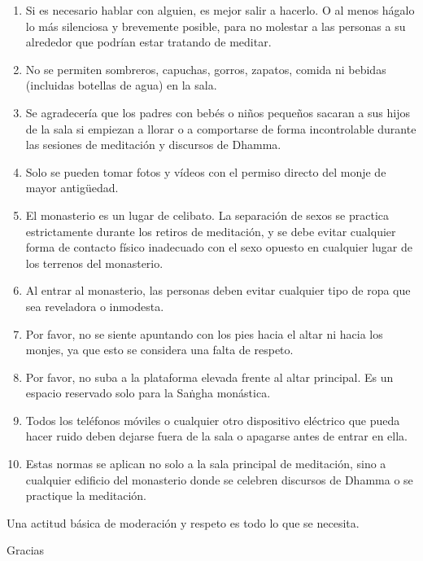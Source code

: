 \begin{enumerate}
\item Si es necesario hablar con alguien, es mejor salir a hacerlo. O al menos hágalo lo más silenciosa y brevemente posible, para no molestar a las personas a su alrededor que podrían estar tratando de meditar.

\item No se permiten sombreros, capuchas, gorros, zapatos, comida ni bebidas (incluidas botellas de agua) en la sala.

\item Se agradecería que los padres con bebés o niños pequeños sacaran a sus hijos de la sala si empiezan a llorar o a comportarse de forma incontrolable durante las sesiones de meditación y discursos de Dhamma.

\item Solo se pueden tomar fotos y vídeos con el permiso directo del monje de mayor antigüedad.

\item El monasterio es un lugar de celibato. La separación de sexos se practica estrictamente durante los retiros de meditación, y se debe evitar cualquier forma de contacto físico inadecuado con el sexo opuesto en cualquier lugar de los terrenos del monasterio.

\item Al entrar al monasterio, las personas deben evitar cualquier tipo de ropa que sea reveladora o inmodesta.

\item Por favor, no se siente apuntando con los pies hacia el altar ni hacia los monjes, ya que esto se considera una falta de respeto.

\item Por favor, no suba a la plataforma elevada frente al altar principal. Es un espacio reservado solo para la Saṅgha monástica.

\item Todos los teléfonos móviles o cualquier otro dispositivo eléctrico que pueda hacer ruido deben dejarse fuera de la sala o apagarse antes de entrar en ella.

\item Estas normas se aplican no solo a la sala principal de meditación, sino a cualquier edificio del monasterio donde se celebren discursos de Dhamma o se practique la meditación.
\end{enumerate}
Una actitud básica de moderación y respeto es todo lo que se necesita.

Gracias




